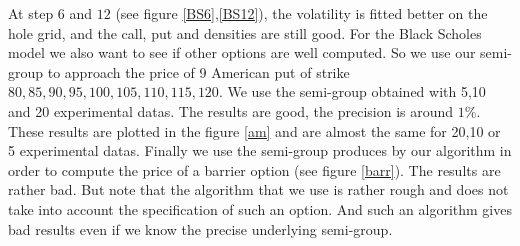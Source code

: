 \documentclass[a4paper]{article}
\begin{document}
At step $6$ and $12$ (see figure \ref{BS6},\ref{BS12}), the
volatility is fitted better on the hole grid, and the call, put
and densities are still good. For the Black Scholes model we also
want to see if other options are well computed. So we use our
semi-group to approach the price of 9 American put of strike
$80,85,90,95,100,105,110,115,120$. We use the semi-group obtained
with 5,10 and 20 experimental datas. The results are good, the
precision is around $1\%$. These results are plotted in the
figure \ref{am} and are almost the same for 20,10 or 5
experimental datas. Finally we use the semi-group produces by our
algorithm in order to compute the price of a barrier option (see
figure \ref{barr}). The results are rather bad. But note that the
algorithm that we use is rather rough and does not take into
account the specification of such an option. And such an algorithm
gives bad results even if we know the precise underlying
semi-group.


\newpage
\end{document}
